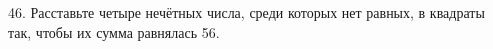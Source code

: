 46. Расставьте четыре нечётных числа, среди которых нет равных, в квадраты так, чтобы их сумма равнялась 56.
\begin{center}
\begin{figure}[ht!]
\end{figure}
\end{center}
